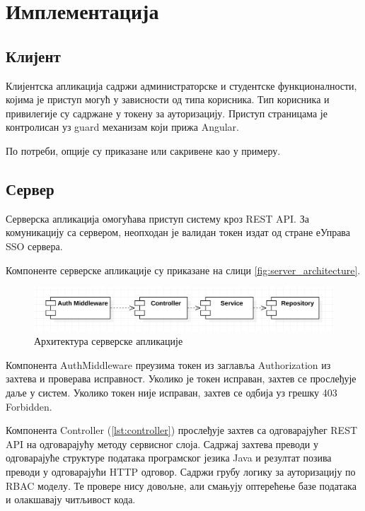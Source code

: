 \documentclass[a4paper]{article}
\begin{document}
\section*{Имплементација}

\subsection*{Клијент}

Клијентска апликација садржи администраторске и студентске функционалности, којима је приступ могућ у зависности од
типа корисника. Тип корисника и привилегије су садржане у токену за ауторизацију. Приступ страницама је контролисан уз guard механизам који прижа Angular.

По потреби, опције су приказане или сакривене као у примеру.

\subsection*{Сервер}

Серверска апликација омогућава приступ систему кроз REST API\cite{rest}. За комуникацију са сервером, неопходан је валидан токен издат од стране еУправа SSO сервера.

Компоненте серверске апликације су приказане на слици \autoref{fig:server_architecture}.

\begin{figure}[H]
    \centering
    \includegraphics{images/server_architecture.png}
    \caption{Архитектура серверске апликације}
    \label{fig:server_architecture}
\end{figure}

Компонента AuthMiddleware преузима токен из заглавља Authorization из захтева и проверава исправност. Уколико је токен 
исправан, захтев се прослеђује даље у систем. Уколико токен није исправан, захтев се одбија уз грешку 403 Forbidden.

Компонента Controller (\autoref{lst:controller}) прослеђује захтев са одговарајућег REST API\cite{rest} на одговарајућу методу сервисног слоја. Садржај
захтева преводи у одговарајуће структуре података програмског језика Java и резултат позива преводи у одговарајући HTTP одговор. Садржи грубу логику за ауторизацију по RBAC\cite{rbac} моделу. Те провере нису довољне, али смањују оптерећење базе података и олакшавају читљивост кода.
\end{document}
